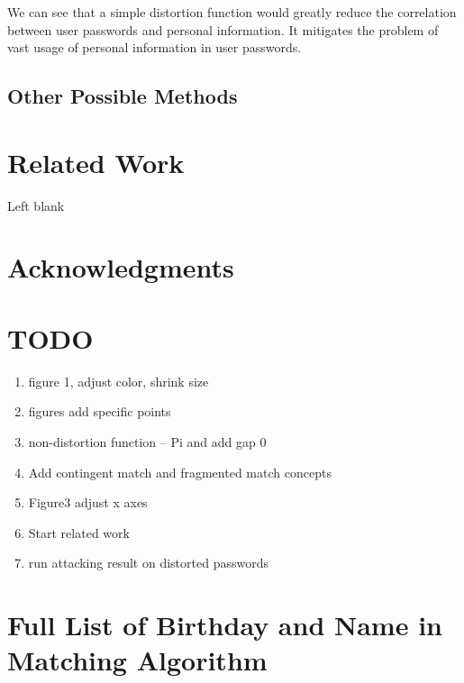 \documentclass{sig-alternate}
\begin{document}
We can see that a simple distortion function would greatly reduce the correlation between user passwords and personal information. It mitigates the problem of vast usage of personal information in user passwords. 

\subsection{Other Possible Methods}



\section{Related Work}
Left blank
\section{Acknowledgments}
\section{TODO}
\begin{enumerate}
\item figure 1, adjust color, shrink size
\item figures add specific points
\item non-distortion function -- Pi and add gap 0
\item Add contingent match and fragmented match concepts
\item Figure3 adjust x axes
\item Start related work
\item run attacking result on distorted passwords
\end{enumerate}


%
%
\appendix
\section{Full List of Birthday and Name in Matching Algorithm}
\end{document}
